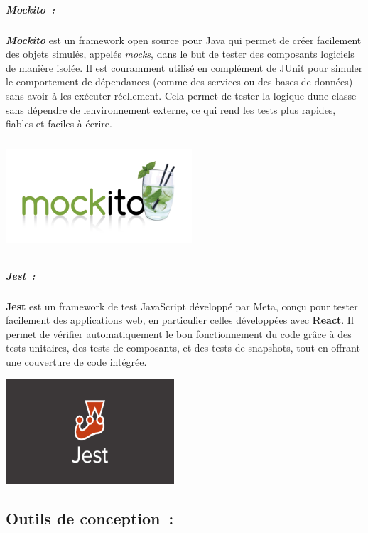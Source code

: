 \documentclass[12pt,a4paper,twoside]{report}
\begin{document}
\hypertarget{mockito}{%
\subparagraph{Mockito~:}\label{mockito}}

\emph{\textbf{Mockito}} est un framework open source pour Java qui
permet de créer facilement des objets simulés, appelés \emph{mocks},
dans le but de tester des composants logiciels de manière isolée. Il est
couramment utilisé en complément de JUnit pour simuler le comportement
de dépendances (comme des services ou des bases de données) sans avoir à
les exécuter réellement. Cela permet de tester la logique
d\textquotesingle une classe sans dépendre de
l\textquotesingle environnement externe, ce qui rend les tests plus
rapides, fiables et faciles à écrire.

\includegraphics[width=2.72569in,height=1.62222in]{latex_media/media/image35.png}

\hypertarget{jest}{%
\subparagraph{Jest~:}\label{jest}}

\textbf{Jest} est un framework de test JavaScript développé par Meta,
conçu pour tester facilement des applications web, en particulier celles
développées avec \textbf{React}. Il permet de vérifier automatiquement
le bon fonctionnement du code grâce à des tests unitaires, des tests de
composants, et des tests de snapshots, tout en offrant une couverture de
code intégrée.

\includegraphics[width=2.47569in,height=1.53542in]{latex_media/media/image36.png}

\hypertarget{outils-de-conception}{%
\subsection{Outils de conception~:}\label{outils-de-conception}}
\end{document}
